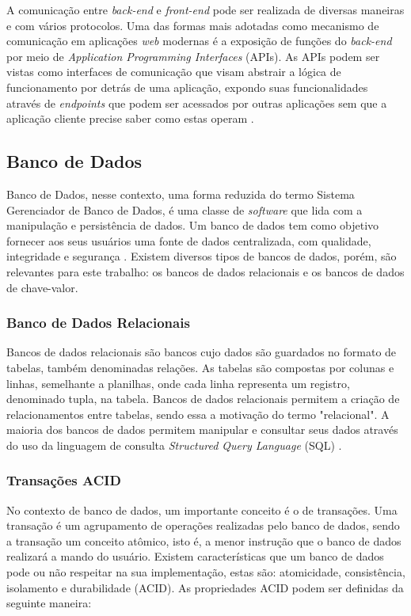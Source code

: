 A comunicação entre \textit{back-end} e \textit{front-end} pode ser realizada de diversas maneiras e com vários protocolos. Uma das formas mais adotadas como mecanismo de comunicação em aplicações \textit{web} modernas é a exposição de funções do \textit{back-end} por meio de \textit{Application Programming Interfaces} (APIs). As APIs podem ser vistas como interfaces de comunicação que visam abstrair a lógica de funcionamento por detrás de uma aplicação, expondo suas funcionalidades através de \textit{endpoints} que podem ser acessados por outras aplicações sem que a aplicação cliente precise saber como estas operam \cite{gough2021mastering}.

\subsection{Banco de Dados}

Banco de Dados, nesse contexto, uma forma reduzida do termo Sistema Gerenciador de Banco de Dados, é uma classe de \textit{software} que lida com a manipulação e persistência de dados. Um banco de dados tem como objetivo fornecer aos seus usuários uma fonte de dados centralizada, com qualidade, integridade e segurança \cite{fry1976evolution}. Existem diversos tipos de bancos de dados, porém, são relevantes para este trabalho: os bancos de dados relacionais e os bancos de dados de chave-valor.

\subsubsection{Banco de Dados Relacionais}

Bancos de dados relacionais são bancos cujo dados são guardados no formato de tabelas, também denominadas relações. As tabelas são compostas por colunas e linhas, semelhante a planilhas, onde cada linha representa um registro, denominado tupla, na tabela. Bancos de dados relacionais permitem a criação de relacionamentos entre tabelas, sendo essa a motivação do termo "relacional". A maioria dos bancos de dados permitem manipular e consultar seus dados através do uso da linguagem de consulta \textit{Structured Query Language} (SQL) \cite{jatana2012survey}.

\subsubsection{Transações ACID}

No contexto de banco de dados, um importante conceito é o de transações. Uma transação é um agrupamento de operações realizadas pelo banco de dados, sendo a transação um conceito atômico, isto é, a menor instrução que o banco de dados realizará a mando do usuário. Existem características que um banco de dados pode ou não respeitar na sua implementação, estas são: atomicidade, consistência, isolamento e durabilidade (ACID). As propriedades ACID podem ser definidas da seguinte maneira:

